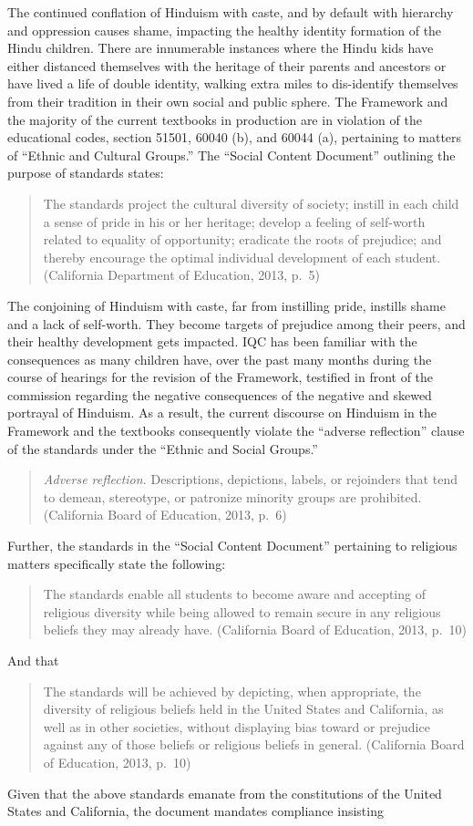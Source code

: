 The continued conflation of Hinduism with caste, and by default with hierarchy and oppression causes shame, impacting the healthy identity formation of the Hindu children. There are innumerable instances where the Hindu kids have either distanced themselves with the heritage of their parents and ancestors or have lived a life of double identity, walking extra miles to dis-identify themselves from their tradition in their own social and public sphere. The Framework and the majority of the current textbooks in production are in violation of the educational codes, section 51501, 60040 (b), and 60044 (a), pertaining to matters of “Ethnic and Cultural Groups.” The “Social Content Document” outlining the purpose of standards states: 
\begin{quote}
The standards project the cultural diversity of society; instill in each child a sense of pride in his or her heritage; develop a feeling of self-worth related to equality of opportunity; eradicate the roots of prejudice; and thereby encourage the optimal individual development of each student. (California Department of Education, 2013, p.\ 5)
\end{quote}
The conjoining of Hinduism with caste, far from instilling pride, instills shame and a lack of self-worth. They become targets of prejudice among their peers, and their healthy development gets impacted. IQC has been familiar with the consequences as many children have, over the past many months during the course of hearings for the revision of the Framework, testified in front of the commission regarding the negative consequences of the negative and skewed portrayal of Hinduism. As a result, the current discourse on Hinduism in the Framework and the textbooks consequently violate the “adverse reflection” clause of the standards under the “Ethnic and Social Groups.” 
\begin{quote}
\textit{Adverse reflection.} Descriptions, depictions, labels, or rejoinders that tend to demean, stereotype, or patronize minority groups are prohibited. (California Board of Education, 2013, p.\ 6)
\end{quote}
Further, the standards in the “Social Content Document” pertaining to religious matters specifically state the following:
\begin{quote}
The standards enable all students to become aware and accepting of religious diversity while being allowed to remain secure in any religious beliefs they may already have. (California Board of Education, 2013, p.\ 10)
\end{quote}
And that
\begin{quote}
The standards will be achieved by depicting, when appropriate, the diversity of religious beliefs held in the United States and California, as well as in other societies, without displaying bias toward or prejudice against any of those beliefs or religious beliefs in general. (California Board of Education, 2013, p.\ 10)
\end{quote}
Given that the above standards emanate from the constitutions of the United States and California, the document mandates compliance insisting

